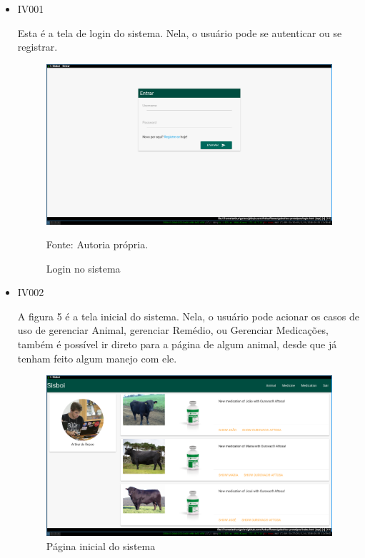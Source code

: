 \begin{itemize}
\item IV001

Esta é a tela de login do sistema. Nela, o usuário pode se autenticar ou se registrar.
\begin{figure}[H]
	\begin{center}
		\caption{Login no sistema}
		\includegraphics[width=13cm]{../img/prototipos/login.png}

		Fonte: Autoria própria.
	\end{center}
\end{figure}

\item IV002

A figura 5 é a tela inicial do sistema. Nela, o usuário pode acionar os casos de uso de gerenciar Animal, gerenciar Remédio, ou Gerenciar Medicações, também é possível ir direto para a página de algum animal, desde que já tenham feito algum manejo com ele.
\begin{figure}[H]
	\begin{center}
		\caption{Página inicial do sistema}
		\includegraphics[width=13cm]{../img/prototipos/index.png}


\end{center}
\end{figure}
\end{itemize}
